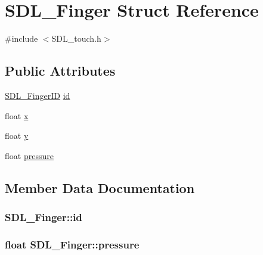 \hypertarget{struct_s_d_l___finger}{}\section{S\+D\+L\+\_\+\+Finger Struct Reference}
\label{struct_s_d_l___finger}


{\ttfamily \#include $<$S\+D\+L\+\_\+touch.\+h$>$}

\subsection*{Public Attributes}
\begin{DoxyCompactItemize}
\item 
\hyperlink{_s_d_l__touch_8h_a5fa58141f78415ca09645af359ad2250}{S\+D\+L\+\_\+\+Finger\+ID} \hyperlink{struct_s_d_l___finger_a3cec630146eeec5bd6299a9387a6f16a}{id}
\item 
float \hyperlink{struct_s_d_l___finger_ab91dfbd03c3215560457fef44e1c7755}{x}
\item 
float \hyperlink{struct_s_d_l___finger_a0a2c7a06ae641940111e03801c672cf9}{y}
\item 
float \hyperlink{struct_s_d_l___finger_a0ecb50c7fd699d59899ac60c941bdee6}{pressure}
\end{DoxyCompactItemize}


\subsection{Member Data Documentation}
\subsubsection[{\texorpdfstring{id}{id}}]{ S\+D\+L\+\_\+\+Finger\+::id}\hypertarget{struct_s_d_l___finger_a3cec630146eeec5bd6299a9387a6f16a}{}\label{struct_s_d_l___finger_a3cec630146eeec5bd6299a9387a6f16a}
\subsubsection[{\texorpdfstring{pressure}{pressure}}]{\setlength{\rightskip}{0pt plus 5cm}float S\+D\+L\+\_\+\+Finger\+::pressure}\hypertarget{struct_s_d_l___finger_a0ecb50c7fd699d59899ac60c941bdee6}{}\label{struct_s_d_l___finger_a0ecb50c7fd699d59899ac60c941bdee6}
